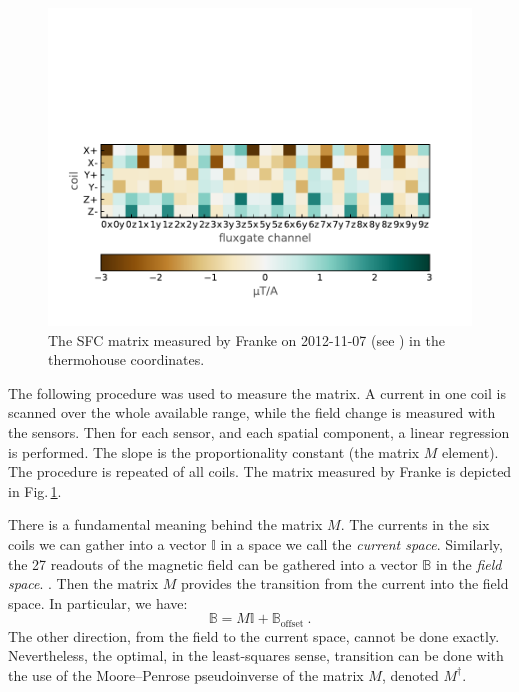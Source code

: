 
\begin{figure}
  \centering
  \includegraphics[width=.8\linewidth]{gfx/nEDM_SFC/nEDM_SFC_matrix}
  \caption{The SFC matrix measured by Franke on 2012-11-07 (see \cite{Franke2013}) in the thermohouse coordinates.}
  \label{fig:nEDM_SFC_matrix}
\end{figure}

The following procedure was used to measure the matrix. A current in one coil is scanned over the whole available range, while the field change is measured with the sensors. Then for each sensor, and each spatial component, a linear regression is performed. The slope is the proportionality constant (the matrix $M$ element). The procedure is repeated of all coils. The matrix measured by Franke is depicted in Fig.\,\ref{fig:nEDM_SFC_matrix}.

There is a fundamental meaning behind the matrix $M$. The currents in the six coils we can gather into a vector $\mathbb{I}$ in a space we call the \emph{current space}. Similarly, the 27 readouts of the magnetic field can be gathered into a vector $\mathbb{B}$ in the \emph{field space}. . Then the matrix $M$ provides the transition from the current into the field space. In particular, we have:
\begin{equation}
  \mathbb{B} = M \mathbb{I} + \mathbb{B}_\text{offset} \ .
\end{equation}
The other direction, from the field to the current space, cannot be done exactly. Nevertheless, the optimal, in the least-squares sense, transition can be done with the use of the Moore--Penrose pseudoinverse  of the matrix $M$, denoted $M^\dagger$.

